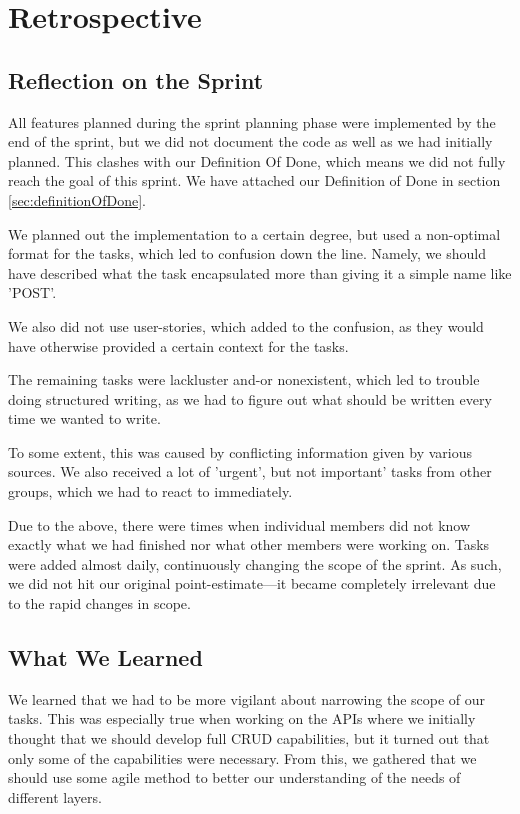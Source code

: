 \section{Retrospective}

\subsection{Reflection on the Sprint}
All features planned during the sprint planning phase were implemented by the end of the sprint, but we did not document the code as well as we had initially planned. 
This clashes with our Definition Of Done, which means we did not fully reach the goal of this sprint. We have attached our Definition of Done in section \ref{sec:definitionOfDone}.

We planned out the implementation to a certain degree, but used a non-optimal format for the tasks, which led to confusion down the line. Namely, we should have described what the task encapsulated more than giving it a simple name like 'POST'. 

We also did not use user-stories, which added to the confusion, as they would have otherwise provided a certain context for the tasks.

The remaining tasks were lackluster and-or nonexistent, which led to trouble doing structured writing, as we had to figure out what should be written every time we wanted to write.
    
To some extent, this was caused by conflicting information given by various sources. We also received a lot of 'urgent', but not important' tasks from other groups, which we had to react to immediately.
    
Due to the above, there were times when individual members did not know exactly what we had finished nor what other members were working on. Tasks were added almost daily, continuously changing the scope of the sprint.
As such, we did not hit our original point-estimate---it became completely irrelevant due to the rapid changes in scope.

\subsection{What We Learned}\label{Whatwelearnedsprint3}
We learned that we had to be more vigilant about narrowing the scope of our tasks. 
This was especially true when working on the APIs where we initially thought that we should develop full CRUD capabilities, but it turned out that only some of the capabilities were necessary. 
From this, we gathered that we should use some agile method to better our understanding of the needs of different layers.

